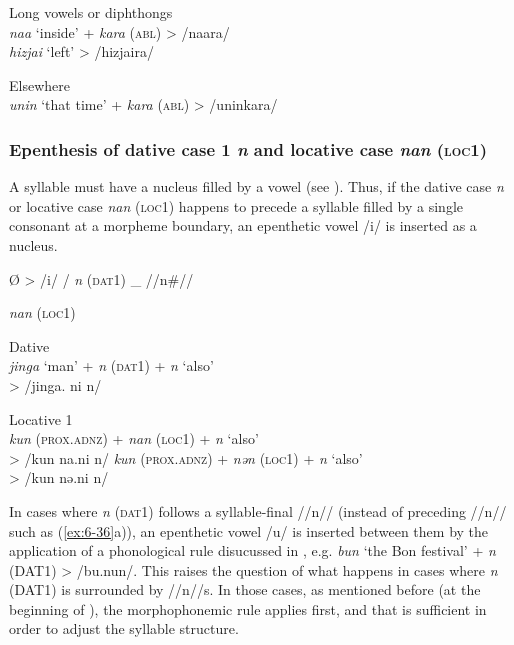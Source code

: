 \ex Long vowels or diphthongs  \\
    \textit{naa}  ‘inside’  +  \textit{kara} (\textsc{abl})  >  /naara/\\
    \textit{hizjai}  ‘left’      >  /hizjaira/  

\ex  Elsewhere\\
\textit{unin}  ‘that time’  +  \textit{kara} (\textsc{abl})  >  /uninkara/\\

\z
\z
\subsubsection{Epenthesis of dative case 1 \textit{n} and locative case \textit{nan} (\textsc{loc1})}

A syllable must have a nucleus filled by a vowel (see ). Thus, if the dative case \textit{n} or locative case \textit{nan} (\textsc{loc1}) happens to precede a syllable filled by a single consonant at a morpheme boundary, an epenthetic vowel /i/ is inserted as a nucleus.

\ea\label{ex:6-35}
    Ø  >  /i/  /  %
    \textit{n}  %
    (\textsc{dat}1)    \_  //n\#//

    \textit{nan}  (\textsc{loc1})

    \ea\label{ex:6-36}
    Dative\\
        \textit{jinga}  ‘man’  +  \textit{n}  (\textsc{dat}1)  +  \textit{n}  ‘also’\\
        >  /jinga.      ni      n/

    \ex Locative 1\\
        \ea  \textit{kun}  (\textsc{prox}.\textsc{adnz})  +  \textit{nan}  (\textsc{loc1})  +  \textit{n}  ‘also’\\
            >  /kun      na.ni      n/
        \ex  \textit{kun}  (\textsc{prox}.\textsc{adnz})  +  \textit{nən}  (\textsc{loc1})  +  \textit{n}  ‘also’\\
            >  /kun      nə.ni      n/
        \z
    \z
\z

In cases where \textit{n} (\textsc{dat}1) follows a syllable-final //n// (instead of preceding //n// such as (\ref{ex:6-36}a)), an epenthetic vowel /u/ is inserted between them by the application of a phonological rule disucussed in , e.g. \textit{bun} ‘the Bon festival’ + \textit{n} (DAT1) > /bu.nun/. This raises the question of what happens in cases where \textit{n} (DAT1) is surrounded by //n//s. In those cases, as mentioned before (at the beginning of ), the morphophonemic rule  applies first, and that is sufficient in order to adjust the syllable structure.

